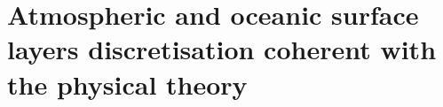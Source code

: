 \chapter{Atmospheric and oceanic surface layers discretisation
coherent with the physical theory}
\label{ch:ND}
\minitoc





